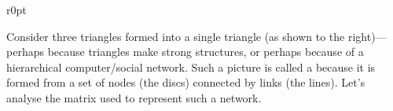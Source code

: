 \begin{wrapfigure}r{0pt}
\end{wrapfigure}
\begin{example} \label{eg:sier2eig}
Consider three triangles formed into a single triangle (as shown to the right)---perhaps because triangles make strong structures, or perhaps because of a hierarchical computer\slash social network.
Such a picture is called a  because it is formed from a set of nodes (the discs) connected by links (the lines).
Let's analyse the matrix used to represent such a network.
 

\end{example}
